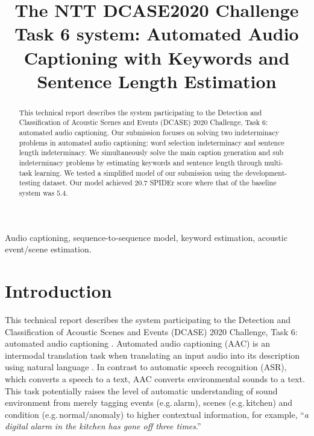\documentclass{article}
\title{The NTT DCASE2020 Challenge Task 6 system: Automated Audio Captioning with Keywords and Sentence Length Estimation}
\begin{document}
\ninept
\maketitle

\begin{sloppy}

\begin{abstract}
This technical report describes the system participating to the Detection and Classification of Acoustic Scenes and Events (DCASE) 2020 Challenge, Task 6: automated audio captioning. Our submission focuses on solving two indeterminacy problems in automated audio captioning: word selection indeterminacy and sentence length indeterminacy. We simultaneously solve the main caption generation and sub indeterminacy problems by estimating keywords and sentence length through multi-task learning. We tested a simplified model of our submission using the development-testing dataset. Our model achieved $20.7$ SPIDEr score where that of the baseline system was $5.4$.
\end{abstract}

\begin{keywords}
Audio captioning, sequence-to-sequence model, keyword estimation, acoustic event/scene estimation.
\end{keywords}


\section{Introduction}
\label{sec:intro}

This technical report describes the system participating to the Detection and Classification of Acoustic Scenes and Events (DCASE) 2020 Challenge, Task 6: automated audio captioning \cite{task}.
Automated audio captioning (AAC) is an intermodal translation task when translating an input audio into its description using natural language \cite{ac1,ac2,ac3,audiocaps,clotho}. In contrast to automatic speech recognition (ASR), which converts a speech to a text, AAC converts environmental sounds to a text. This task potentially raises the level of automatic understanding of sound environment from merely tagging events \cite{aed,aed2} (e.g.\,alarm), scenes \cite{asc} (e.g.\,kitchen) and condition \cite{asd} (e.g.\,normal/anomaly) to higher contextual information, for example, ``{\it a digital alarm in the kitchen has gone off three times}.''


\end{sloppy}
\end{document}
